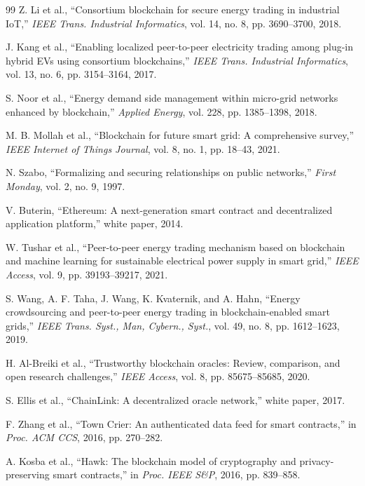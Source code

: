 \documentclass{ieeeaccess}
\begin{document}
\begin{thebibliography}{99}
Z. Li et al., ``Consortium blockchain for secure energy trading in industrial IoT,'' \emph{IEEE Trans. Industrial Informatics}, vol. 14, no. 8, pp. 3690--3700, 2018.

J. Kang et al., ``Enabling localized peer-to-peer electricity trading among plug-in hybrid EVs using consortium blockchains,'' \emph{IEEE Trans. Industrial Informatics}, vol. 13, no. 6, pp. 3154--3164, 2017.

S. Noor et al., ``Energy demand side management within micro-grid networks enhanced by blockchain,'' \emph{Applied Energy}, vol. 228, pp. 1385--1398, 2018.

M. B. Mollah et al., ``Blockchain for future smart grid: A comprehensive survey,'' \emph{IEEE Internet of Things Journal}, vol. 8, no. 1, pp. 18--43, 2021.

N. Szabo, ``Formalizing and securing relationships on public networks,'' \emph{First Monday}, vol. 2, no. 9, 1997.

V. Buterin, ``Ethereum: A next-generation smart contract and decentralized application platform,'' white paper, 2014.

W. Tushar et al., ``Peer-to-peer energy trading mechanism based on blockchain and machine learning for sustainable electrical power supply in smart grid,'' \emph{IEEE Access}, vol. 9, pp. 39193--39217, 2021.

S. Wang, A. F. Taha, J. Wang, K. Kvaternik, and A. Hahn, ``Energy crowdsourcing and peer-to-peer energy trading in blockchain-enabled smart grids,'' \emph{IEEE Trans. Syst., Man, Cybern., Syst.}, vol. 49, no. 8, pp. 1612--1623, 2019.

H. Al-Breiki et al., ``Trustworthy blockchain oracles: Review, comparison, and open research challenges,'' \emph{IEEE Access}, vol. 8, pp. 85675--85685, 2020.

S. Ellis et al., ``ChainLink: A decentralized oracle network,'' white paper, 2017.

F. Zhang et al., ``Town Crier: An authenticated data feed for smart contracts,'' in \emph{Proc. ACM CCS}, 2016, pp. 270--282.

A. Kosba et al., ``Hawk: The blockchain model of cryptography and privacy-preserving smart contracts,'' in \emph{Proc. IEEE S\&P}, 2016, pp. 839--858.


\end{thebibliography}
\end{document}
